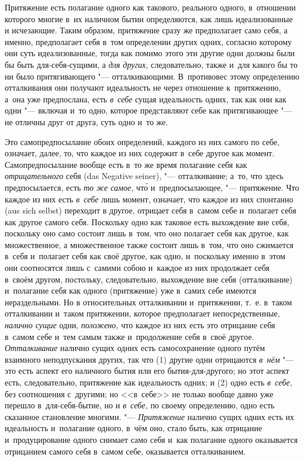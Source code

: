 Притяжение есть полагание одного как такового, реального одного, в~отношении
которого многие в~их наличном бытии определяются, как лишь идеализованные и
исчезающие. Таким образом, притяжение сразу же предполагает само себя, а
именно, предполагает себя в~том определении других одних, согласно которому
они суть идеализованные, тогда как помимо этого эти другие одни должны были
бы быть для-себя-сущими, а {\em для других,}
следовательно, также и~для какого бы то ни было притягивающего
"--- отталкивающими. В~противовес этому определению отталкивания они получают
идеальность не через отношение к~притяжению, а~она уже предпослана, есть
{\em в~себе} сущая идеальность одних, так как они как одни "--- включая
и~то одно, которое представляют себе как притягивающее "--- не
отличны друг от друга, суть одно и~то же.

Это самопредпосылание обоих определений, каждого из них самого по себе,
означает, далее, то, что каждое из них содержит в~себе другое как момент.
Самопредпосылание вообще есть в~то же время полагание себя как
{\em отрицательного} себя (das Negative seiner), "---
отталкивание; а~то, что здесь предпосылается, есть
{\em то же самое,} чт\'{о} и~предпосылающее, "--- притяжение.
Что каждое из них есть {\em в~себе} лишь момент,
означает, что каждое из них спонтанно (aus sich selbst) переходит в
другое, отрицает себя в~самом себе и~полагает себя как другое самого себя.
Поскольку одно как таковое есть выхождение вне себя, поскольку оно само
состоит лишь в~том, что оно полагает себя как другое, как множественное, а
множественное также состоит лишь в~том, что оно сжимается в~себя и~полагает
себя как своё другое, как одно, и~поскольку именно в~этом они соотносятся
лишь с~самими собою и~каждое из них продолжает себя в~своём другом,
постольку, следовательно, выхождение вне себя (отталкивание) и~полагание
себя как одного (притяжение) уже в~самих себе имеются нераздельными. Но в
относительных отталкивании и~притяжении, т.~е. в~таком отталкивании и~таком
притяжении, которое предполагает непосредственные, {\em налично сущие} одни,
{\em положено,} что каждое из них есть это отрицание
себя в~самом себе и~тем самым также и~продолжение себя в~своё другое.
{\em Отталкивание} налично сущих одних есть
самосохранение одного путём взаимного неподпускания других, так что (1)
другие одни отрицаются {\em в~нём} "--- это есть аспект
его наличного бытия или его бытия-для-другого; но этот аспект есть,
следовательно, притяжение как идеальность одних; и (2) одно есть
{\em в~себе,} без соотношения с~другими; но <<в~себе>> не
только вообще давно уже перешло в~для-себя-бытие, но и
{\em в~себе,} по своему определению, одно есть
сказанное становление многими. "--- {\em Притяжение}
налично сущих одних есть их идеальность и~полагание одного, в~чём оно,
стало быть, как отрицание и~продуцирование одного снимает само себя и~как
полагание одного оказывается отрицанием самого себя в~самом себе,
оказывается отталкиванием.

